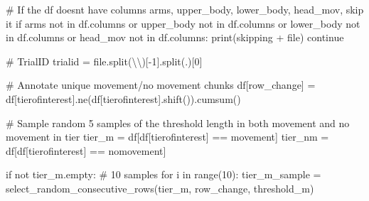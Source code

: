 \documentclass[
  letterpaper,
  DIV=11,
  numbers=noendperiod]{scrreprt}
\newenvironment{Shaded}{\begin{snugshade}}{\end{snugshade}}
\newcommand{\BuiltInTok}[1]{\textcolor[rgb]{0.00,0.23,0.31}{#1}}
\newcommand{\CharTok}[1]{\textcolor[rgb]{0.13,0.47,0.30}{#1}}
\newcommand{\CommentTok}[1]{\textcolor[rgb]{0.37,0.37,0.37}{#1}}
\newcommand{\ControlFlowTok}[1]{\textcolor[rgb]{0.00,0.23,0.31}{#1}}
\newcommand{\DecValTok}[1]{\textcolor[rgb]{0.68,0.00,0.00}{#1}}
\newcommand{\KeywordTok}[1]{\textcolor[rgb]{0.00,0.23,0.31}{#1}}
\newcommand{\NormalTok}[1]{\textcolor[rgb]{0.00,0.23,0.31}{#1}}
\newcommand{\OperatorTok}[1]{\textcolor[rgb]{0.37,0.37,0.37}{#1}}
\newcommand{\StringTok}[1]{\textcolor[rgb]{0.13,0.47,0.30}{#1}}
\begin{document}
\begin{Shaded}
\begin{Highlighting}[]
        \CommentTok{\# If the df doesn\textquotesingle{}t have columns arms, upper\_body, lower\_body, head\_mov, skip it}
        \ControlFlowTok{if} \StringTok{\textquotesingle{}arms\textquotesingle{}} \KeywordTok{not} \KeywordTok{in}\NormalTok{ df.columns }\KeywordTok{or} \StringTok{\textquotesingle{}upper\_body\textquotesingle{}} \KeywordTok{not} \KeywordTok{in}\NormalTok{ df.columns }\KeywordTok{or} \StringTok{\textquotesingle{}lower\_body\textquotesingle{}} \KeywordTok{not} \KeywordTok{in}\NormalTok{ df.columns }\KeywordTok{or} \StringTok{\textquotesingle{}head\_mov\textquotesingle{}} \KeywordTok{not} \KeywordTok{in}\NormalTok{ df.columns:}
            \BuiltInTok{print}\NormalTok{(}\StringTok{\textquotesingle{}skipping \textquotesingle{}} \OperatorTok{+} \BuiltInTok{file}\NormalTok{)}
            \ControlFlowTok{continue}

        \CommentTok{\# TrialID}
\NormalTok{        trialid }\OperatorTok{=} \BuiltInTok{file}\NormalTok{.split(}\StringTok{\textquotesingle{}}\CharTok{\textbackslash{}\textbackslash{}}\StringTok{\textquotesingle{}}\NormalTok{)[}\OperatorTok{{-}}\DecValTok{1}\NormalTok{].split(}\StringTok{\textquotesingle{}.\textquotesingle{}}\NormalTok{)[}\DecValTok{0}\NormalTok{]}

        \CommentTok{\# Annotate unique movement/no movement chunks}
\NormalTok{        df[}\StringTok{\textquotesingle{}row\_change\textquotesingle{}}\NormalTok{] }\OperatorTok{=}\NormalTok{ df[tierofinterest].ne(df[tierofinterest].shift()).cumsum()}

        \CommentTok{\# Sample random 5 samples of the threshold length in both movement and no movement in tier}
\NormalTok{        tier\_m }\OperatorTok{=}\NormalTok{ df[df[tierofinterest] }\OperatorTok{==} \StringTok{\textquotesingle{}movement\textquotesingle{}}\NormalTok{]}
\NormalTok{        tier\_nm }\OperatorTok{=}\NormalTok{ df[df[tierofinterest] }\OperatorTok{==} \StringTok{\textquotesingle{}nomovement\textquotesingle{}}\NormalTok{]}

        \ControlFlowTok{if} \KeywordTok{not}\NormalTok{ tier\_m.empty:}
            \CommentTok{\# 10 samples}
            \ControlFlowTok{for}\NormalTok{ i }\KeywordTok{in} \BuiltInTok{range}\NormalTok{(}\DecValTok{10}\NormalTok{):}
\NormalTok{                tier\_m\_sample }\OperatorTok{=}\NormalTok{ select\_random\_consecutive\_rows(tier\_m, }\StringTok{\textquotesingle{}row\_change\textquotesingle{}}\NormalTok{, threshold\_m)}


\end{Highlighting}
\end{Shaded}
\end{document}
